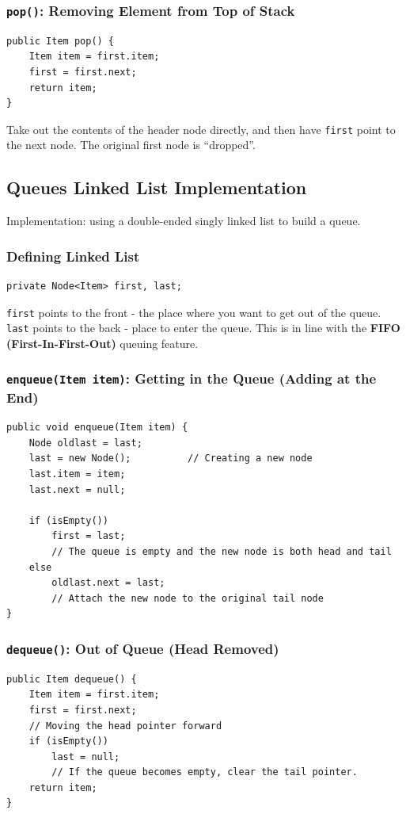 \documentclass[letterpaper,12pt]{article}
\begin{document}
\subsubsection{\texttt{pop()}: Removing Element from Top of Stack}
\begin{verbatim}
public Item pop() {
    Item item = first.item;
    first = first.next;
    return item;
}
\end{verbatim}
Take out the contents of the header node directly, and then have \texttt{first} point to the next node. The original first node is “dropped”.

\subsection{Queues Linked List Implementation}
Implementation: using a double-ended singly linked list to build a queue.
\subsubsection{Defining Linked List}
\begin{verbatim}
private Node<Item> first, last;
\end{verbatim}
\texttt{first} points to the front - the place where you want to get out of the queue. \texttt{last} points to the back - place to enter the queue. This is in line with the \textbf{FIFO (First-In-First-Out)} queuing feature.

\subsubsection{\texttt{enqueue(Item item)}: Getting in the Queue (Adding at the End)}
\begin{verbatim}
public void enqueue(Item item) {
    Node oldlast = last;
    last = new Node();          // Creating a new node
    last.item = item;
    last.next = null;
    
    if (isEmpty())
        first = last;
        // The queue is empty and the new node is both head and tail
    else
        oldlast.next = last;
        // Attach the new node to the original tail node
}
\end{verbatim}

\subsubsection{\texttt{dequeue()}: Out of Queue (Head Removed)}
\begin{verbatim}
public Item dequeue() {
    Item item = first.item;
    first = first.next;
    // Moving the head pointer forward
    if (isEmpty())
        last = null;
        // If the queue becomes empty, clear the tail pointer.
    return item;
}
\end{verbatim}
\end{document}
